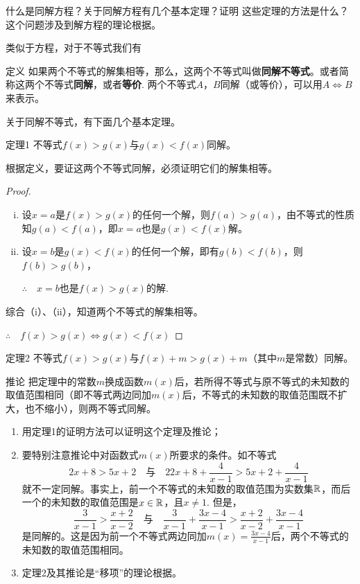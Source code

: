 什么是同解方程？关于同解方程有几个基本定理？证明
这些定理的方法是什么？这个问题涉及到解方程的理论根据。

类似于方程，对于不等式我们有

\begin{thm}{定义} 
    如果两个不等式的解集相等，那么，这两个不等式叫做\textbf{同解不等式}。或者简称这两个不等式\textbf{同解}，或者\textbf{等价}. 两个不等式$A$，$B$同解（或等价），可以用$A\Longleftrightarrow B$来表示。
\end{thm}

关于同解不等式，有下面几个基本定理。

\begin{thm}{定理1}
    不等式$f(x)>g(x)$与$g(x)<f(x)$同解。
\end{thm}

\begin{analyze}
    根据定义，要证这两个不等式同解，必须证明它们的解集相等。
\end{analyze}

\begin{proof}
\begin{enumerate}[(i)]
    \item 设$x=a$是$f(x)>g(x)$的任何一个解，则$f(a)>g(a)$，由不等式的性质知$g(a)<f(a)$，即$x=a$也是$g(x)<f(x)$解。

    \item 设$x=b$是$g(x)<f(x)$的任何一个解，即有$g(b)<f(b)$，则$f(b)>g(b)$，
    
    $\therefore\quad x=b$也是$f(x)>g(x)$的解.
\end{enumerate}
综合（i）、（ii），知道两个不等式的解集相等。

$\therefore\quad f(x)>g(x)\Longleftrightarrow g(x)<f(x)$
\end{proof}

\begin{thm}{定理2}
    不等式$f(x)>g(x)$与$f(x)+m>g(x)+m$（其中$m$是常数）同解。
\end{thm}

\begin{thm}{推论}
  把定理中的常数$m$换成函数$m(x)$后，若所得不等式与原不等式的未知数的取值范围相同（即不等式两边同加$m(x)$后，不等式的未知数的取值范围既不扩大，也不缩小），则两不等式同解。  
\end{thm}

\begin{note}
\begin{enumerate}[(1)]
\item 用定理1的证明方法可以证明这个定理及推论；
\item 要特别注意推论中对函数式$m(x)$所要求的条件。如不等式
\[2x+8>5x+2\quad \text{与}\quad 22x+8+\frac{4}{x-1}>5x+2+\frac{4}{x-1}\]
就不一定同解。事实上，前一个不等式的未知数的取值范围为实数集$\mathbb{R}$，而后一个的未知数的取值范围是$x\in\mathbb{R}$，且$x\ne 1$. 但是，
\[\frac{3}{x-1}>\frac{x+2}{x-2}\quad \text{与}\quad \frac{3}{x-1}+\frac{3x-4}{x-1}>\frac{x+2}{x-2}+\frac{3x-4}{x-1}\]
是同解的。这是因为前一个不等式两边同加$m(x)=\frac{3x-4}{x-1}$后，两个不等式的未知数的取值范围相同。
\item 定理2及其推论是“移项”的理论根据。
\end{enumerate}
\end{note}

